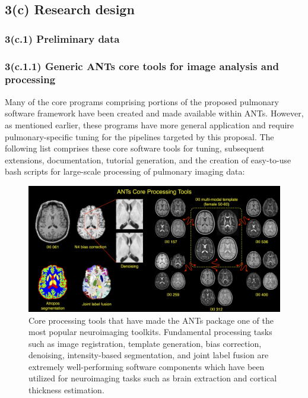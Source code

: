 \documentclass[11pt,]{article}
\begin{document}
\subsection{\textbf{3(c) Research design}}\label{c-research-design}

\subsubsection{3(c.1) Preliminary data}\label{c.1-preliminary-data}

\subsubsection{3(c.1.1) Generic ANTs core tools for image analysis and
processing}\label{c.1.1-generic-ants-core-tools-for-image-analysis-and-processing}

Many of the core programs comprising portions of the proposed pulmonary
software framework have been created and made available within ANTs.
However, as mentioned earlier, these programs have more general
application and require pulmonary-specific tuning for the pipelines
targeted by this proposal. The following list comprises these core
software tools for tuning, subsequent extensions, documentation,
tutorial generation, and the creation of easy-to-use bash scripts for
large-scale processing of pulmonary imaging data:

\begin{figure}[htbp]
\centering
\includegraphics{Figs/coreANtsToolsNeuro.png}
\caption{Core processing tools that have made the ANTs package one of
the most popular neuroimaging toolkits. Fundamental processing tasks
such as image registration, template generation, bias correction,
denoising, intensity-based segmentation, and joint label fusion are
extremely well-performing software components which have been utilized
for neuroimaging tasks such as brain extraction and cortical thickness
estimation.}
\end{figure}
\end{document}
